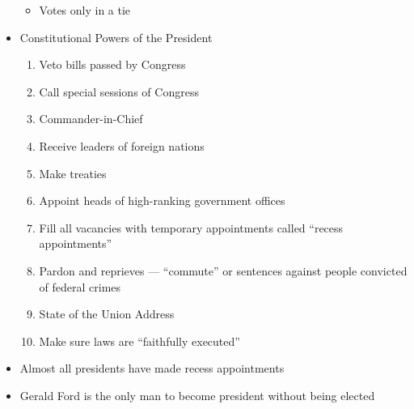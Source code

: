\documentclass[12pt]{article}
\begin{document}
\begin{itemize}
\begin{itemize}
      \item Votes only in a tie

    \end{itemize}

  \item Constitutional Powers of the President

    \begin{enumerate}

      \item Veto bills passed by Congress

      \item Call special sessions of Congress

      \item Commander-in-Chief

      \item Receive leaders of foreign nations

      \item Make treaties

      \item Appoint heads of high-ranking government offices

      \item Fill all vacancies with temporary appointments called “recess appointments”

      \item Pardon and reprieves — “commute” or sentences against people convicted of federal crimes

      \item State of the Union Address

      \item Make sure laws are “faithfully executed”

    \end{enumerate}

  \item Almost all presidents have made recess appointments

  \item Gerald Ford is the only man to become president without being elected

\end{itemize}
\end{document}
